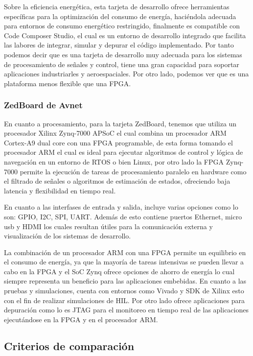 Sobre la eficiencia energética, esta tarjeta de desarrollo ofrece herramientas específicas para la optimización del consumo de energía, haciéndola adecuada para entornos de consumo energético 
restringido, finalmente es compatible con Code Composer Studio, el cual es un entorno de desarrollo integrado que facilita las labores de integrar, simular y depurar el código implementado. Por tanto podemos decir que es una tarjeta de desarrollo muy adecuada para los sistemas de procesamiento de señales y control, tiene una gran capacidad para soportar aplicaciones industriarles y aeroespaciales. Por otro lado, podemos ver que es una plataforma menos flexible que una FPGA. 

\subsubsection{ZedBoard de Avnet}

En cuanto a procesamiento, para la tarjeta ZedBoard, tenemos que utiliza un procesador Xilinx Zynq-7000 APSoC el cual combina un procesador ARM Cortex-A9 dual core con una FPGA programable, de esta forma tomando el procesador ARM el cual es ideal para ejecutar algoritmos de control y  lógica de navegación en un entorno de RTOS o bien Linux, por otro lado la FPGA Zynq-7000 permite la ejecución de tareas de procesamiento paralelo en hardware como el filtrado de señales o algoritmos de estimación de estados, ofreciendo baja latencia y flexibilidad en tiempo real.

En cuanto a las interfases de entrada y salida, incluye varias opciones como lo son: GPIO, I2C, SPI, UART. Además de esto contiene puertos Ethernet, micro usb y HDMI los cuales resultan útiles para la comunicación externa y visualización de los sistemas de desarrollo.

La combinación de un procesador ARM con una FPGA permite un equilibrio en el consumo de energía, ya que la mayoría de tareas intensivas se pueden llevar a cabo en la FPGA y el SoC Zynq ofrece opciones de ahorro de energía lo cual siempre representa un beneficio para las aplicaciones embebidas. En cuanto a las pruebas y simulaciones, cuenta con entornos como Vivado y SDK de Xilinx esto con el fin de realizar simulaciones de HIL. Por otro lado ofrece aplicaciones para depuración como lo es JTAG para el monitoreo en tiempo real de las aplicaciones ejecutándose en la FPGA y en el procesador ARM.
\subsection{Criterios de comparación}

